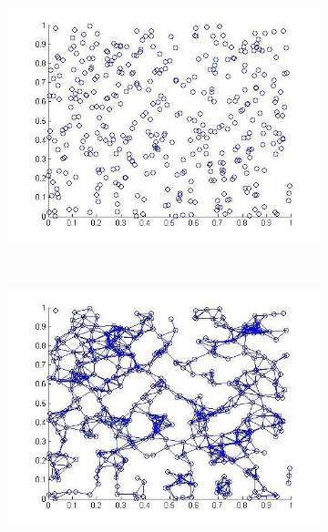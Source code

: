 \begin{figure}
  \centering
  \begin{subfigure}[b]{0.33\textwidth}
    \includegraphics[width=\textwidth]{images/geometric1.png}
    \caption{}
    \label{fig:geo1}  
  \end{subfigure}
  ~ %
  \begin{subfigure}[b]{0.33\textwidth}
    \centering
    \includegraphics[width=\textwidth]{images/geometric2.png}
    \caption{}
    \label{fig:geo2}    
   \end{subfigure}
    ~ %

\end{figure}
